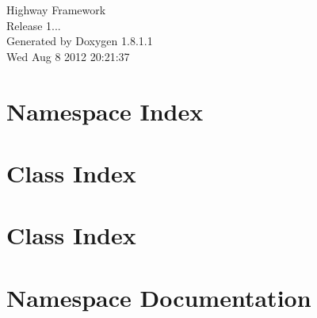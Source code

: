 \documentclass{book}
\begin{document}
\hypersetup{pageanchor=false,citecolor=blue}
\begin{titlepage}
\vspace*{7cm}
\begin{center}
{\Large Highway Framework \\[1ex]\large Release 1... }\\
\vspace*{1cm}
{\large Generated by Doxygen 1.8.1.1}\\
\vspace*{0.5cm}
{\small Wed Aug 8 2012 20:21:37}\\
\end{center}
\end{titlepage}
\clearemptydoublepage
{}
\tableofcontents
\clearemptydoublepage
{}
\hypersetup{pageanchor=true,citecolor=blue}
\chapter{Namespace Index}

\chapter{Class Index}

\chapter{Class Index}

\chapter{Namespace Documentation}


















\end{document}
